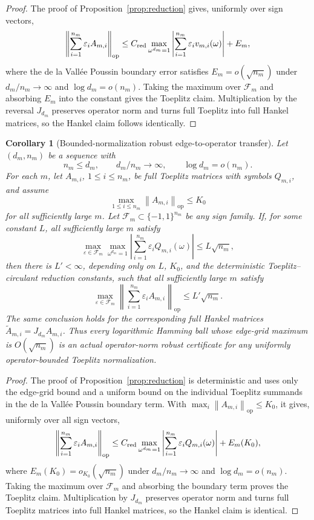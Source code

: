 \documentclass[11pt]{amsart}
\numberwithin{equation}{section}
\newtheorem{corollary}[theorem]{Corollary}
\theoremstyle{definition}
\theoremstyle{remark}
\newcommand{\op}{\mathrm{op}}
\newcommand{\norm}[1]{\left\lVert #1\right\rVert}
\newcommand{\eps}{\varepsilon}
\begin{document}
\begin{proof}
The proof of Proposition~\ref{prop:reduction} gives, uniformly over sign
vectors,
\[
  \left\|\sum_{i=1}^{n_m}\eps_iA_{m,i}\right\|_{\op}
  \le
  C_{\rm red}\max_{\omega^{d_m}=1}
  \left|\sum_{i=1}^{n_m}\eps_i v_{m,i}(\omega)\right|
  +E_m,
\]
where the de la Vall\'ee Poussin boundary error satisfies
\(E_m=o(\sqrt{n_m})\) under \(d_m/n_m\to\infty\) and \(\log d_m=o(n_m)\).
Taking the maximum over \(\mathcal F_m\) and absorbing \(E_m\) into the
constant gives the Toeplitz claim.  Multiplication by the reversal \(J_{d_m}\)
preserves operator norm and turns full Toeplitz into full Hankel matrices, so
the Hankel claim follows identically.
\end{proof}

\begin{corollary}[Bounded-normalization robust edge-to-operator transfer]
\label{cor:bounded-edge-to-operator-robust}
Let \((d_m,n_m)\) be a sequence with
\[
  n_m\le d_m,\qquad d_m/n_m\to\infty,\qquad \log d_m=o(n_m).
\]
For each \(m\), let \(A_{m,i}\), \(1\le i\le n_m\), be full Toeplitz matrices
with symbols \(Q_{m,i}\), and assume
\[
  \max_{1\le i\le n_m}\norm{A_{m,i}}_{\op}\le K_0
\]
for all sufficiently large \(m\).  Let
\(\mathcal F_m\subset\{-1,1\}^{n_m}\) be any sign family.  If, for some
constant \(L\), all sufficiently large \(m\) satisfy
\[
  \max_{\eps\in\mathcal F_m}\max_{\omega^{d_m}=1}
  \left|\sum_{i=1}^{n_m}\eps_i Q_{m,i}(\omega)\right|
  \le L\sqrt{n_m},
\]
then there is \(L'<\infty\), depending only on \(L\), \(K_0\), and the
deterministic Toeplitz--circulant reduction constants, such that all
sufficiently large \(m\) satisfy
\[
  \max_{\eps\in\mathcal F_m}
  \left\|\sum_{i=1}^{n_m}\eps_iA_{m,i}\right\|_{\op}
  \le L'\sqrt{n_m}.
\]
The same conclusion holds for the corresponding full Hankel matrices
\(\widetilde A_{m,i}=J_{d_m}A_{m,i}\).  Thus every logarithmic Hamming ball
whose edge-grid maximum is \(O(\sqrt{n_m})\) is an actual operator-norm robust
certificate for any uniformly operator-bounded Toeplitz normalization.
\end{corollary}

\begin{proof}
The proof of Proposition~\ref{prop:reduction} is deterministic and uses only
the edge-grid bound and a uniform bound on the individual Toeplitz summands in
the de la Vall\'ee Poussin boundary term.  With
\(\max_i\norm{A_{m,i}}_{\op}\le K_0\), it gives, uniformly over all sign
vectors,
\[
  \left\|\sum_{i=1}^{n_m}\eps_iA_{m,i}\right\|_{\op}
  \le
  C_{\rm red}\max_{\omega^{d_m}=1}
  \left|\sum_{i=1}^{n_m}\eps_i Q_{m,i}(\omega)\right|
  +E_m(K_0),
\]
where \(E_m(K_0)=o_{K_0}(\sqrt{n_m})\) under
\(d_m/n_m\to\infty\) and \(\log d_m=o(n_m)\).  Taking the maximum over
\(\mathcal F_m\) and absorbing the boundary term proves the Toeplitz claim.
Multiplication by \(J_{d_m}\) preserves operator norm and turns full Toeplitz
matrices into full Hankel matrices, so the Hankel claim is identical.
\end{proof}
\end{document}
